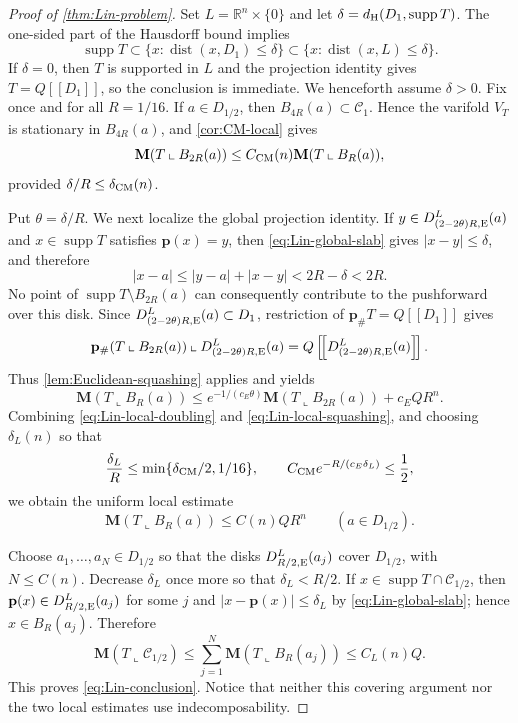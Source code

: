 \documentclass[11pt,reqno]{amsart}
\numberwithin{equation}{section}
\theoremstyle{definition}
\theoremstyle{remark}
\newcommand{\R}{\mathbb R}
\newcommand{\Mass}{\mathbf M}
\newcommand{\supp}{\operatorname{supp}}
\newcommand{\dist}{\operatorname{dist}}
\newcommand{\restr}{\mathbin{\llcorner}}
\newcommand{\cur}[1]{\left[\!\left[#1\right]\!\right]}
\begin{document}
\begin{proof}[Proof of \cref{thm:Lin-problem}]
Set $L=\R^n\times\{0\}$ and let
$\delta=d_{\rm H}(D_1,\supp T)$.  The one-sided part of the Hausdorff bound
implies
\begin{equation}\label{eq:Lin-global-slab}
 \supp T\subset\{x:\dist(x,D_1)\le\delta\}
 \subset\{x:\dist(x,L)\le\delta\}.
\end{equation}
If $\delta=0$, then $T$ is supported in $L$ and the projection identity gives
$T=Q\cur{D_1}$, so the conclusion is immediate.  We henceforth assume
$\delta>0$.
Fix once and for all $R=1/16$.  If $a\in D_{1/2}$, then
$B_{4R}(a)\subset\mathcal C_1$.  Hence the varifold $V_T$ is stationary in
$B_{4R}(a)$, and \cref{cor:CM-local} gives
\begin{equation}\label{eq:Lin-local-doubling}
 \Mass(T\restr B_{2R}(a))
 \le C_{\rm CM}(n)\Mass(T\restr B_R(a)),
\end{equation}
provided $\delta/R\le\delta_{\rm CM}(n)$.

Put $\theta=\delta/R$.  We next localize the global projection identity.  If
$y\in D_{(2-2\theta)R,{\rm E}}^L(a)$ and $x\in\supp T$ satisfies
$\mathbf p(x)=y$, then \eqref{eq:Lin-global-slab} gives
$|x-y|\le\delta$, and therefore
\[
 |x-a|\le |y-a|+|x-y|<2R-\delta<2R.
\]
No point of $\supp T\setminus B_{2R}(a)$ can consequently contribute to the
pushforward over this disk.  Since
$D_{(2-2\theta)R,{\rm E}}^L(a)\subset D_1$, restriction of
$\mathbf p_\#T=Q\cur{D_1}$ gives
\begin{equation}\label{eq:Lin-local-projection}
 \mathbf p_\#(T\restr B_{2R}(a))
 \restr D_{(2-2\theta)R,{\rm E}}^L(a)
 =Q\cur{D_{(2-2\theta)R,{\rm E}}^L(a)}.
\end{equation}
Thus \cref{lem:Euclidean-squashing} applies and yields
\begin{equation}\label{eq:Lin-local-squashing}
 \Mass(T\restr B_R(a))
 \le e^{-1/(c_E\theta)}\Mass(T\restr B_{2R}(a))+c_EQR^n.
\end{equation}
Combining \eqref{eq:Lin-local-doubling} and
\eqref{eq:Lin-local-squashing}, and choosing $\delta_L(n)$ so that
\[
 \frac{\delta_L}{R}\le\min\{\delta_{\rm CM}/2,1/16\},
 \qquad
 C_{\rm CM}e^{-R/(c_E\delta_L)}\le\frac12,
\]
we obtain the uniform local estimate
\begin{equation}\label{eq:Lin-local-absolute}
 \Mass(T\restr B_R(a))\le C(n)QR^n
 \qquad(a\in D_{1/2}).
\end{equation}

Choose $a_1,\dots,a_N\in D_{1/2}$ so that the disks
$D_{R/2,{\rm E}}^L(a_j)$ cover $D_{1/2}$, with $N\le C(n)$.  Decrease
$\delta_L$ once more so that $\delta_L<R/2$.  If
$x\in\supp T\cap\mathcal C_{1/2}$, then
$\mathbf p(x)\in D_{R/2,{\rm E}}^L(a_j)$ for some $j$ and
$|x-\mathbf p(x)|\le\delta_L$ by \eqref{eq:Lin-global-slab}; hence
$x\in B_R(a_j)$.  Therefore
\[
 \Mass(T\restr\mathcal C_{1/2})
 \le\sum_{j=1}^N\Mass(T\restr B_R(a_j))
 \le C_L(n)Q.
\]
This proves \eqref{eq:Lin-conclusion}.  Notice that neither this covering
argument nor the two local estimates use indecomposability.
\end{proof}
\end{document}
